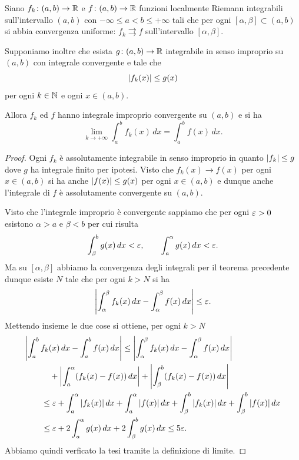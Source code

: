 \begin{theorem}%
  \label{th:convergenza_dominata_uniforme}%
%
  Siano $f_k\colon (a,b) \to {\mathbb R}$ e $f\colon (a,b)\to {\mathbb R}$ funzioni 
  localmente Riemann integrabili
  sull'intervallo $(a,b)$ con $-\infty \le a < b \le +\infty$
  tali che per ogni $[\alpha,\beta]\subset (a,b)$ 
  si abbia convergenza uniforme: $f_k\rightrightarrows f$ 
  sull'intervallo $[\alpha,\beta]$.
  
  Supponiamo inoltre che esista $g\colon (a,b)\to {\mathbb R}$
  integrabile in senso improprio su $(a,b)$ con integrale convergente e tale
  che
  \[
  {\left|f_k(x)\right|}\le g(x)
  \]
  per ogni $k\in {\mathbb N}$ e ogni $x\in (a,b)$.
    
  Allora $f_k$ ed $f$ hanno integrale improprio convergente su $(a,b)$ e si ha
  \[
    \lim_{k\to+\infty} \int_a^b f_k(x)\, dx = \int_a^b f(x)\, dx.
  \]
\end{theorem}
%
\begin{proof}
  Ogni $f_k$ è assolutamente integrabile in senso improprio in quanto
  ${\left|f_k\right|}\le g$ dove $g$ ha integrale finito per ipotesi.
  Visto che $f_k(x)\to f(x)$ per ogni  $x\in (a,b)$
  si ha anche ${\left|f(x)\right|}\le g(x)$ per ogni $x\in (a,b)$ 
  e dunque anche l'integrale di $f$ è assolutamente convergente su $(a,b)$.
  
  Visto che l'integrale improprio è convergente sappiamo che 
  per ogni $\varepsilon>0$ esistono $\alpha>a$ e $\beta<b$ per cui risulta
  \[
    \int_\beta^b g(x)\, dx < \varepsilon, \qquad 
    \int_a^\alpha g(x)\, dx < \varepsilon.
  \]
  Ma su $[\alpha ,\beta]$ abbiamo la convergenza degli integrali per il teorema precedente
  dunque esiste $N$ tale che per ogni $k > N$ si ha 
  \[
   {\left|\int_\alpha^\beta f_k(x)\, dx - \int_\alpha^\beta f(x)\, dx\right|} \le \varepsilon. 
  \]
  Mettendo insieme le due cose si ottiene,
  per ogni $k>N$
  \begin{align*}
    \MoveEqLeft{\abs{\int_a^b f_k(x)\, dx - \int_a^b f(x)\, dx}} \le \abs{\int_\alpha^\beta f_k(x)\, dx - \int_\alpha^\beta f(x)\, dx} \\
    & \quad + \abs{\int_a^\alpha (f_k(x) - f(x))\, dx }
      + \abs{\int_\beta^b (f_k(x) - f(x))\, dx } \\
    &\le \eps 
    + \int_a^\alpha \abs{f_k(x)}\, dx + \int_a^\alpha\abs{f(x)}\, dx
    + \int_\beta^b \abs{f_k(x)}\, dx + \int_\beta^b\abs{f(x)}\, dx\\
    &\le \eps 
    + 2 \int_a^\alpha g(x)\,dx
    + 2 \int_\beta^b g(x)\,dx 
    \le 5 \eps.
  \end{align*}
  Abbiamo quindi verficato la tesi tramite la definizione di limite.
\end{proof}

